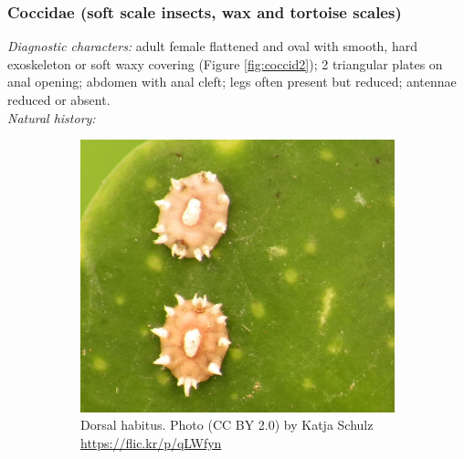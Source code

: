 \documentclass[letterpaper, 11pt]{article}
\begin{document}
\subsubsection{Coccidae (soft scale insects, wax and tortoise scales)}
\noindent{}\textit{Diagnostic characters:} adult female flattened and oval with smooth, hard exoskeleton or soft waxy covering (Figure \ref{fig:coccid2}); 2 triangular plates on anal opening; abdomen with anal cleft; legs often present but reduced; antennae reduced or absent.\\

\noindent{}\textit{Natural history:} \\

\begin{figure}[ht!]
 \centering
 \begin{subfigure}[ht!]{0.45\textwidth}
  \includegraphics[width=\textwidth]{CoccidDorsalHabitus}
  \caption{Dorsal habitus. Photo (CC BY 2.0) by Katja Schulz \url{https://flic.kr/p/qLWfyn}}
  \label{fig:coccid1}
 \end{subfigure}
 \qquad
 \begin{subfigure}[ht!]{0.45\textwidth}

\end{subfigure}
\end{figure}
\end{document}
